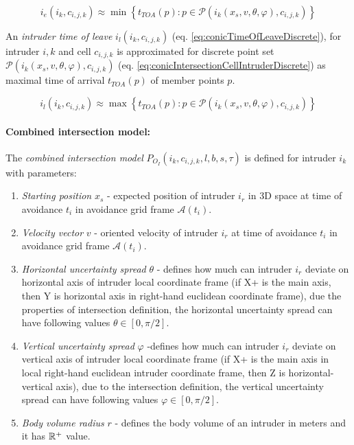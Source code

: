\begin{equation}\label{eq:conicTimeOfEntryDiscrete}
    i_e(i_k,c_{i,j,k})\approx \min \left\{t_{TOA}({p}):{p}\in\mathscr{P}(i_k({x}_s,{v},\theta,\varphi),c_{i,j,k})\right\}
\end{equation}

\noindent An \emph{intruder time of leave} $i_l(i_k,c_{i,j,k})$ (eq. \ref{eq:conicTimeOfLeaveDiscrete}), for intruder $i,k$ and cell $c_{i,j,k}$ is approximated for discrete point set  $\mathscr{P}(i_k({x}_s,{v},\theta,\varphi),c_{i,j,k})$ (eq. \ref{eq:conicIntersectionCellIntruderDiscrete}) as maximal time of arrival $t_{TOA}({p})$ of member points ${p}$.

\begin{equation}\label{eq:conicTimeOfLeaveDiscrete}
    i_l(i_k,c_{i,j,k})\approx \max \left\{t_{TOA}({p}):{p}\in\mathscr{P}(i_k({x}_s,{v},\theta,\varphi),c_{i,j,k})\right\}
\end{equation}

\paragraph{Combined intersection model:} The \emph{combined intersection model} $P_{O_I}(i_k,c_{i,j,k},l,b,s,\tau)$ is defined for intruder $i_k$ with parameters:

\begin{enumerate}
    \item\textit{Starting position} ${x}_s$ - expected position of intruder $i_r$ in 3D space at time of avoidance $t_i$ in avoidance grid frame $\mathscr{A}(t_i)$.
    
    \item\textit{Velocity vector} ${v}$ - oriented velocity of intruder $i_r$ at time of avoidance $t_i$ in avoidance grid frame $\mathscr{A}(t_i)$. 
    
    \item\textit{Horizontal uncertainty spread} $\theta$ - defines how much can intruder $i_r$ deviate on horizontal axis of intruder local coordinate frame (if X+ is the main axis, then Y is horizontal axis in right-hand euclidean coordinate frame), due the properties of intersection definition, the horizontal uncertainty spread can have following values $\theta\in[0,\pi/2]$.
    
    \item\textit{Vertical uncertainty spread} $\varphi$ -defines how much can intruder $i_r$ deviate on vertical axis of intruder local coordinate frame (if X+ is the main axis in local right-hand euclidean intruder coordinate frame, then Z is horizontal-vertical axis), due to the intersection definition, the vertical uncertainty spread can have following values $\varphi\in[0,\pi/2]$.
    
    \item\textit{Body volume radius} $r$ - defines the body volume of an intruder in meters and it has  $\mathbb{R}^+$  value.
\end{enumerate}

